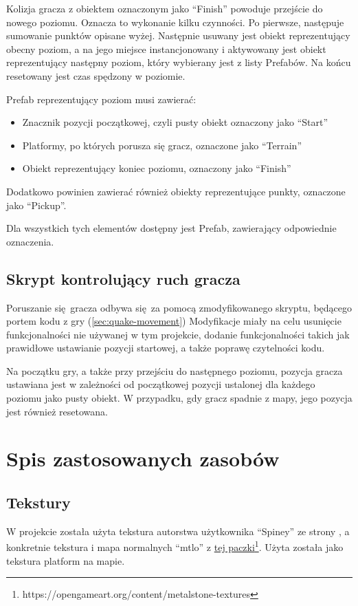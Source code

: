 \documentclass[10pt,a4paper]{article}
\begin{document}
Kolizja gracza z obiektem oznaczonym jako ``Finish'' powoduje przejście do nowego
poziomu. Oznacza to wykonanie kilku czynności. Po pierwsze, następuje sumowanie
punktów opisane wyżej. Następnie usuwany jest obiekt reprezentujący obecny
poziom, a na jego miejsce instancjonowany i aktywowany jest obiekt reprezentujący
następny poziom, który wybierany jest z listy Prefabów. Na końcu resetowany jest
czas spędzony w poziomie.

Prefab reprezentujący poziom musi zawierać:
\begin{itemize}
	\item Znacznik pozycji początkowej, czyli pusty obiekt oznaczony jako ``Start''
	\item Platformy, po których porusza się gracz, oznaczone jako ``Terrain''
	\item Obiekt reprezentujący koniec poziomu, oznaczony jako ``Finish''
\end{itemize}
Dodatkowo powinien zawierać również obiekty reprezentujące punkty, oznaczone
jako ``Pickup''.

Dla wszystkich tych elementów dostępny jest Prefab, zawierający odpowiednie
oznaczenia.

\subsection{Skrypt kontrolujący ruch gracza}

Poruszanie się gracza odbywa się za pomocą zmodyfikowanego skryptu, będącego
portem kodu z gry  (\ref{sec:quake-movement})
 Modyfikacje miały na celu usunięcie funkcjonalności nie używanej
w tym projekcie, dodanie funkcjonalności takich jak prawidłowe ustawianie
pozycji startowej, a także poprawę czytelności kodu.

Na początku gry, a także przy przejściu do następnego poziomu, pozycja gracza
ustawiana jest w zależności od początkowej pozycji ustalonej dla każdego poziomu
jako pusty obiekt. W przypadku, gdy gracz spadnie z mapy, jego pozycja jest
również resetowana.

% 

\section{Spis zastosowanych zasobów}
\subsection{Tekstury}
W projekcie została użyta tekstura autorstwa użytkownika ``Spiney'' ze strony
\href{https://opengameart.org}, a konkretnie tekstura i mapa normalnych
``mtl\textunderscore o''
z \href{https://opengameart.org/content/metalstone-textures}{tej paczki}\footnote{https://opengameart.org/content/metalstone-textures}. Użyta
została jako tekstura platform na mapie.
\end{document}
